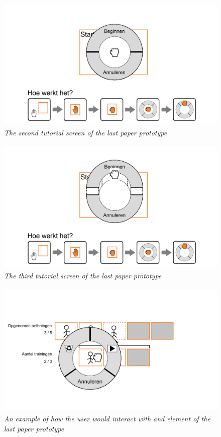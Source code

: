 \begin{figure}[H]
	\begin{center}
		\includegraphics[width=12cm, height=6.5cm]{figures/prototype_8_6_tutorial_2.png}
		\caption{\emph{The second tutorial screen of the last paper prototype}}
		\label{second tutorial last prototype}
	\end{center}
\end{figure}

\begin{figure}[H]
	\begin{center}
		\includegraphics[width=12cm, height=6.5cm]{figures/prototype_9_6_tutorial_3.png}
		\caption{\emph{The third tutorial screen of the last paper prototype}}
		\label{third tutorial last prototype}
	\end{center}
\end{figure}

\begin{figure}[H]
	\begin{center}
		\includegraphics[width=12cm, height=6.5cm]{figures/prototype_10_6_example.png}
		\caption{\emph{An example of how the user would interact with and element of the last paper prototype}}
		\label{example last prototype}
	\end{center}
\end{figure}


